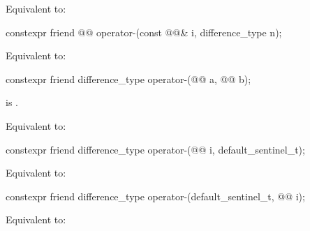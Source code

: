 \begin{wgText}[{[simd]}]
\begin{itemdescr}
\pnum
\effects
Equivalent to: 
\end{itemdescr}

\begin{itemdecl}
constexpr friend @@ operator-(const @@& i, difference_type n);
\end{itemdecl}

\begin{itemdescr}
\pnum
\effects
Equivalent to: 
\end{itemdescr}

\begin{itemdecl}
constexpr friend difference_type operator-(@@ a, @@ b);
\end{itemdecl}

\begin{itemdescr}
\pnum
\expects
{} is .

\pnum
\effects
Equivalent to: 
\end{itemdescr}

\begin{itemdecl}
constexpr friend difference_type operator-(@@ i, default_sentinel_t);
\end{itemdecl}

\begin{itemdescr}
\pnum
\effects
Equivalent to: 
\end{itemdescr}


\begin{itemdecl}
constexpr friend difference_type operator-(default_sentinel_t, @@ i);
\end{itemdecl}

\begin{itemdescr}
\pnum
\effects
Equivalent to: 
\end{itemdescr}
\end{wgText}

